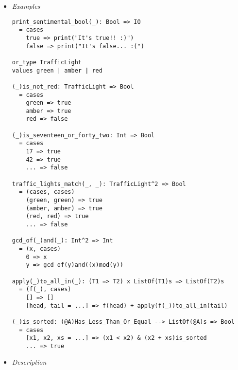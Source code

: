 \documentclass[diploma]{softlab-thesis}
\begin{document}
\begin{itemize}
\item \textit{Examples}

\begin{verbatim}
print_sentimental_bool(_): Bool => IO
  = cases
    true => print("It's true!! :)")
    false => print("It's false... :(")

or_type TrafficLight
values green | amber | red

(_)is_not_red: TrafficLight => Bool
  = cases
    green => true
    amber => true
    red => false

(_)is_seventeen_or_forty_two: Int => Bool
  = cases
    17 => true
    42 => true
    ... => false

traffic_lights_match(_, _): TrafficLight^2 => Bool
  = (cases, cases)
    (green, green) => true
    (amber, amber) => true
    (red, red) => true
    ... => false

gcd_of(_)and(_): Int^2 => Int
  = (x, cases)
    0 => x
    y => gcd_of(y)and((x)mod(y))

apply(_)to_all_in(_): (T1 => T2) x ListOf(T1)s => ListOf(T2)s
  = (f(_), cases)
    [] => []
    [head, tail = ...] => f(head) + apply(f(_))to_all_in(tail)

(_)is_sorted: (@A)Has_Less_Than_Or_Equal --> ListOf(@A)s => Bool
  = cases
    [x1, x2, xs = ...] => (x1 < x2) & (x2 + xs)is_sorted
    ... => true
\end{verbatim}

\newpage

\item \textit{Description}


\end{itemize}
\end{document}
